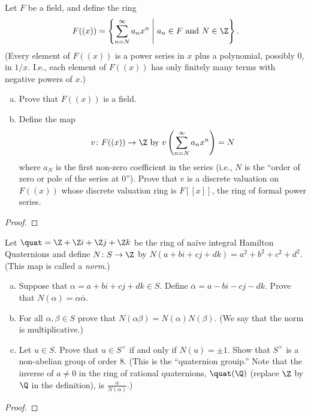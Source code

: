 \documentclass[10pt]{amsart}
\begin{document}
\begin{thm}
  Let $F$ be a field, and define the ring $$F((x)) = \left\{ \sum_{n=N}^\infty a_nx^n \;\middle\vert\; a_n \in F\ \text{and}\ N \in \Z\right\}.$$
  (Every element of $F((x))$ is a power series in $x$ plus a polynomial, possibly 0, in $1/x$.  
  I.e., each element of $F((x))$ has only finitely many terms with negative powers of $x$.)
  \begin{enumerate}[(a)]
  \item
    Prove that $F((x))$ is a field.
  \item
    Define the map 
    $$v \colon F((x)) \rightarrow \Z\ \text{by}\ v\left(\sum_{n=N}^\infty a_nx^n\right) = N$$
    where $a_N$ is the first non-zero coefficient in the series (i.e., $N$ is the ``order of zero or pole of the series at 0'').
    Prove that $v$ is a discrete valuation on $F((x))$ whose discrete valuation ring is $F[[x]]$, the ring of formal power series.
  \end{enumerate}
  \begin{proof}
  \end{proof}
\end{thm}

\begin{thm}
  Let $\quat = \Z + \Z i + \Z j + \Z k$ be the ring of na\"{i}ve integral Hamilton Quaternions and define $N \colon S \rightarrow \Z$ by $N(a + bi + cj + dk) = a^2 + b^2 + c^2 + d^2$.
  (This map is called a {\it norm}.)
  \begin{enumerate}[(a)]
  \item
    Suppose that $\alpha = a + bi + cj + dk \in S$.
    Define $\overline{\alpha} = a - bi - cj - dk$.
    Prove that $N(\alpha) = \alpha \overline{\alpha}$.
  \item
    For all $\alpha, \beta \in S$ prove that $N(\alpha\beta) = N(\alpha)N(\beta)$.
    (We say that the norm is multiplicative.)
  \item
    Let $u \in S$.
    Prove that $u \in S^\times$ if and only if $N(u) = \pm 1$.
    Show that $S^\times$ is a non-abelian group of order 8.
    (This is the ``quaternion grouip.''
    Note that the inverse of $a \neq 0$ in the ring of rational quaternions, $\quat(\Q)$ (replace $\Z$ by $\Q$ in the definition), is $\frac{\overline{\alpha}}{N(\alpha)}$.)
  \end{enumerate}
  \begin{proof}
  \end{proof}
\end{thm}
\end{document}
